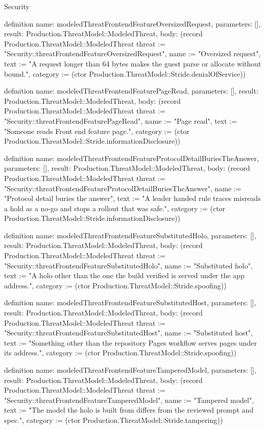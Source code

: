 \begin{lexlean}{Security}
\begin{semanticmodule}
definition{
  name: modeledThreatFrontendFeatureOversizedRequest,
  parameters: [],
  result: Production.ThreatModel::ModeledThreat,
  body: (record Production.ThreatModel::ModeledThreat {threat := "Security::threatFrontendFeatureOversizedRequest", name := "Oversized request", text := "A request longer than 64 bytes makes the guest parse or allocate without bound.", category := (ctor Production.ThreatModel::Stride.denialOfService)})
}

definition{
  name: modeledThreatFrontendFeaturePageRead,
  parameters: [],
  result: Production.ThreatModel::ModeledThreat,
  body: (record Production.ThreatModel::ModeledThreat {threat := "Security::threatFrontendFeaturePageRead", name := "Page read", text := "Someone reads Front end feature page.", category := (ctor Production.ThreatModel::Stride.informationDisclosure)})
}

definition{
  name: modeledThreatFrontendFeatureProtocolDetailBuriesTheAnswer,
  parameters: [],
  result: Production.ThreatModel::ModeledThreat,
  body: (record Production.ThreatModel::ModeledThreat {threat := "Security::threatFrontendFeatureProtocolDetailBuriesTheAnswer", name := "Protocol detail buries the answer", text := "A leader handed rule traces misreads a hold as a no-go and stops a rollout that was safe.", category := (ctor Production.ThreatModel::Stride.informationDisclosure)})
}

definition{
  name: modeledThreatFrontendFeatureSubstitutedHolo,
  parameters: [],
  result: Production.ThreatModel::ModeledThreat,
  body: (record Production.ThreatModel::ModeledThreat {threat := "Security::threatFrontendFeatureSubstitutedHolo", name := "Substituted holo", text := "A holo other than the one the build verified is served under the app address.", category := (ctor Production.ThreatModel::Stride.spoofing)})
}

definition{
  name: modeledThreatFrontendFeatureSubstitutedHost,
  parameters: [],
  result: Production.ThreatModel::ModeledThreat,
  body: (record Production.ThreatModel::ModeledThreat {threat := "Security::threatFrontendFeatureSubstitutedHost", name := "Substituted host", text := "Something other than the repository Pages workflow serves pages under its address.", category := (ctor Production.ThreatModel::Stride.spoofing)})
}

definition{
  name: modeledThreatFrontendFeatureTamperedModel,
  parameters: [],
  result: Production.ThreatModel::ModeledThreat,
  body: (record Production.ThreatModel::ModeledThreat {threat := "Security::threatFrontendFeatureTamperedModel", name := "Tampered model", text := "The model the holo is built from differs from the reviewed prompt and spec.", category := (ctor Production.ThreatModel::Stride.tampering)})
}


\end{semanticmodule}
\end{lexlean}

